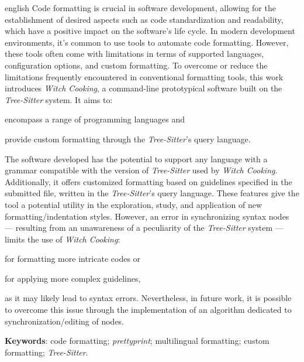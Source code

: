 \documentclass
  [11pt,a4paper,english,brazil,openright,sumario=tradicional,twoside]
  {abntex2}
\newcommand{\treesitter}{\textit{Tree-Sitter}\xspace}
\newcommand{\witchcooking}{\textit{Witch Cooking}\xspace}
\begin{document}

  \begin{resumo}[Abstract]
    \begin{otherlanguage*}{english}
      Code formatting is crucial in software development, allowing for the
      establishment of desired aspects such as code standardization and
      readability, which have a positive impact on the software's life cycle.
      In modern development environments, it's common to use tools to automate
      code formatting. However, these tools often come with limitations in
      terms of supported languages, configuration options, and custom
      formatting. To overcome or reduce the limitations frequently encountered
      in conventional formatting tools, this work introduces \witchcooking, a
      command-line prototypical software built on the \treesitter system. It
      aims to:
      \begin{inparaenum}
        \item encompass a range of programming languages and
        \item provide custom formatting through the \treesitter's query
              language.
      \end{inparaenum}
      The software developed has the potential to support any language with a
      grammar compatible with the version of \treesitter used by \witchcooking.
      Additionally, it offers customized formatting based on guidelines
      specified in the submitted file, written in the \treesitter's query
      language. These features give the tool a potential utility in the
      exploration, study, and application of new formatting/indentation styles.
      However, an error in synchronizing syntax nodes --- resulting from an
      unawareness of a peculiarity of the \treesitter system --- limits the use
      of \witchcooking:
      \begin{inparaenum}
        \item for formatting more intricate codes or
        \item for applying more complex guidelines,
      \end{inparaenum}
      as it may likely lead to syntax errors. Nevertheless, in future work, it
      is possible to overcome this issue through the implementation of an
      algorithm dedicated to synchronization/editing of nodes.

      \noindent
      \textbf{Keywords}:
      code formatting;
      \textit{prettyprint};
      multilingual formatting;
      custom formatting;
      \treesitter.
    \end{otherlanguage*}
  \end{resumo}
\end{document}
